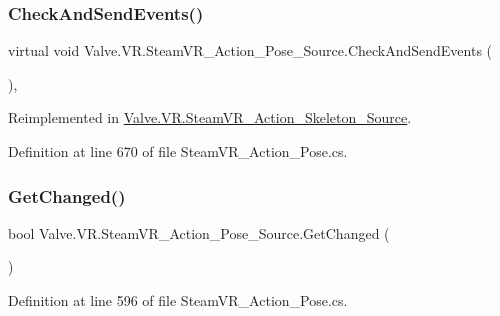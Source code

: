 \subsubsection{\texorpdfstring{CheckAndSendEvents()}{CheckAndSendEvents()}}
{\footnotesize\ttfamily virtual void Valve.\+V\+R.\+Steam\+V\+R\+\_\+\+Action\+\_\+\+Pose\+\_\+\+Source.\+Check\+And\+Send\+Events (\begin{DoxyParamCaption}{ }\end{DoxyParamCaption})\hspace{0.3cm}{\ttfamily [protected]}, {\ttfamily [virtual]}}



Reimplemented in \mbox{\hyperlink{class_valve_1_1_v_r_1_1_steam_v_r___action___skeleton___source_a28767b72b6df82708843c477b3740ccb}{Valve.\+V\+R.\+Steam\+V\+R\+\_\+\+Action\+\_\+\+Skeleton\+\_\+\+Source}}.



Definition at line 670 of file Steam\+V\+R\+\_\+\+Action\+\_\+\+Pose.\+cs.

\mbox{\label{class_valve_1_1_v_r_1_1_steam_v_r___action___pose___source_afc0592915bfe736886dad8e8b97cbd7f}} 
\subsubsection{\texorpdfstring{GetChanged()}{GetChanged()}}
{\footnotesize\ttfamily bool Valve.\+V\+R.\+Steam\+V\+R\+\_\+\+Action\+\_\+\+Pose\+\_\+\+Source.\+Get\+Changed (\begin{DoxyParamCaption}{ }\end{DoxyParamCaption})\hspace{0.3cm}{\ttfamily [protected]}}



Definition at line 596 of file Steam\+V\+R\+\_\+\+Action\+\_\+\+Pose.\+cs.

\mbox{\label{class_valve_1_1_v_r_1_1_steam_v_r___action___pose___source_acac4de6fa4feee04ba8050e11716e97a}} 
